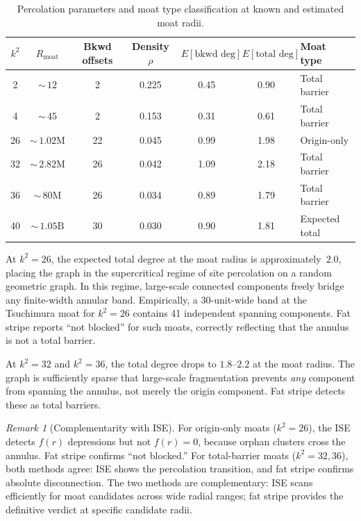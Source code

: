 \documentclass[11pt,a4paper]{article}
\newcommand{\fr}{f(r)}
\theoremstyle{definition}
\theoremstyle{plain}
\theoremstyle{remark}
\newtheorem{remark}[theorem]{Remark}
\begin{document}
\begin{table}[ht]
\centering
\small
\begin{tabular}{@{}ccccccl@{}}
\toprule
$k^2$ & $R_{\text{moat}}$ & Bkwd offsets & Density $\rho$ & $E[\text{bkwd deg}]$ & $E[\text{total deg}]$ & Moat type \\
\midrule
2  & ${\sim}\,12$       & 2  & 0.225 & 0.45 & 0.90 & Total barrier \\
4  & ${\sim}\,45$       & 2  & 0.153 & 0.31 & 0.61 & Total barrier \\
26 & ${\sim}\,1.02\text{M}$ & 22 & 0.045 & 0.99 & 1.98 & Origin-only \\
32 & ${\sim}\,2.82\text{M}$ & 26 & 0.042 & 1.09 & 2.18 & Total barrier \\
36 & ${\sim}\,80\text{M}$   & 26 & 0.034 & 0.89 & 1.79 & Total barrier \\
40 & ${\sim}\,1.05\text{B}$ & 30 & 0.030 & 0.90 & 1.81 & Expected total \\
\bottomrule
\end{tabular}
\caption{Percolation parameters and moat type classification at known and estimated moat radii.}
\label{tab:moat-types}
\end{table}

At $k^2 = 26$, the expected total degree at the moat radius is approximately~$2.0$, placing the graph in the supercritical regime of site percolation on a random geometric graph.  In this regime, large-scale connected components freely bridge any finite-width annular band.  Empirically, a 30-unit-wide band at the Tsuchimura moat for $k^2 = 26$ contains 41 independent spanning components.  Fat stripe reports ``not blocked'' for such moats, correctly reflecting that the annulus is not a total barrier.

At $k^2 = 32$ and $k^2 = 36$, the total degree drops to $1.8$--$2.2$ at the moat radius.  The graph is sufficiently sparse that large-scale fragmentation prevents \emph{any} component from spanning the annulus, not merely the origin component.  Fat stripe detects these as total barriers.

\begin{remark}[Complementarity with ISE]\label{rem:complementarity}
For origin-only moats ($k^2 = 26$), the ISE detects $\fr$ depressions but not $\fr = 0$, because orphan clusters cross the annulus.  Fat stripe confirms ``not blocked.''  For total-barrier moats ($k^2 = 32, 36$), both methods agree: ISE shows the percolation transition, and fat stripe confirms absolute disconnection.  The two methods are complementary: ISE scans efficiently for moat candidates across wide radial ranges; fat stripe provides the definitive verdict at specific candidate radii.
\end{remark}
\end{document}
